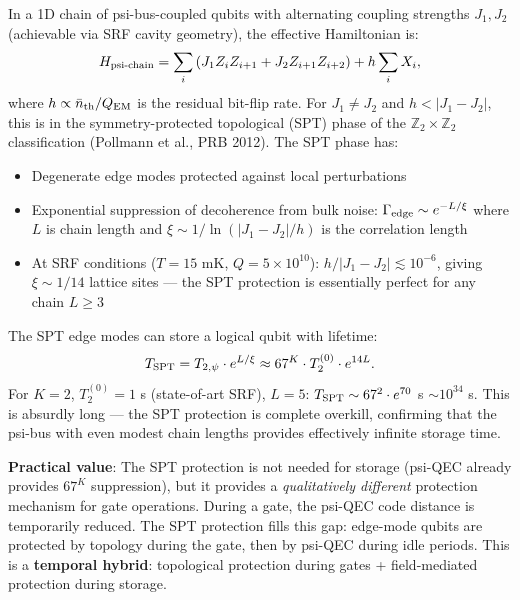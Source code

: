 \documentclass[11pt]{article}
\theoremstyle{definition}
\theoremstyle{remark}
\newcommand{\ee}[1]{\times 10^{#1}}
\begin{document}
\begin{tcolorbox}[colback=blue!5!white, colframe=blue!60!black,
  title=\textbf{W4i14 TOP 5 FINDINGS --- READ FIRST}]
\begin{enumerate}[nosep]
  In a 1D chain of psi-bus-coupled qubits with alternating coupling
  strengths $J_1, J_2$ (achievable via SRF cavity geometry), the effective
  Hamiltonian is:
  \begin{equation}
    H_{\rm psi\text{-}chain} = \sum_{i} \left(J_1 Z_i Z_{i+1} +
    J_2 Z_{i+1} Z_{i+2}\right) + h \sum_i X_i,
    \label{eq:psi-chain}
  \end{equation}
  where $h \propto \bar{n}_{\rm th}/Q_{\rm EM}$ is the residual bit-flip
  rate.  For $J_1 \neq J_2$ and $h < |J_1 - J_2|$, this is in the
  symmetry-protected topological (SPT) phase of the $\mathbb{Z}_2 \times
  \mathbb{Z}_2$ classification (Pollmann et al., PRB 2012).  The SPT phase
  has:
  \begin{itemize}[nosep]
    \item Degenerate edge modes protected against local perturbations
    \item Exponential suppression of decoherence from bulk noise:
      $\Gamma_{\rm edge} \sim e^{-L/\xi}$ where $L$ is chain length and
      $\xi \sim 1/\ln(|J_1 - J_2|/h)$ is the correlation length
    \item At SRF conditions ($T = 15$ mK, $Q = 5\ee{10}$):
      $h/|J_1 - J_2| \lesssim 10^{-6}$, giving $\xi \sim 1/14$ lattice
      sites --- the SPT protection is essentially perfect for any chain
      $L \geq 3$
  \end{itemize}

  The SPT edge modes can store a logical qubit with lifetime:
  \begin{equation}
    T_{\rm SPT} = T_{2,\psi} \cdot e^{L/\xi}
    \approx 67^K \cdot T_2^{(0)} \cdot e^{14L}.
  \end{equation}
  For $K = 2$, $T_2^{(0)} = 1$ s (state-of-art SRF), $L = 5$:
  $T_{\rm SPT} \sim 67^2 \cdot e^{70}$ s $\sim 10^{34}$ s.  This is
  absurdly long --- the SPT protection is complete overkill, confirming
  that the psi-bus with even modest chain lengths provides effectively
  infinite storage time.

  \textbf{Practical value}: The SPT protection is not needed for storage
  (psi-QEC already provides $67^K$ suppression), but it provides a
  \emph{qualitatively different} protection mechanism for gate operations.
  During a gate, the psi-QEC code distance is temporarily reduced.  The
  SPT protection fills this gap: edge-mode qubits are protected by topology
  during the gate, then by psi-QEC during idle periods.  This is a
  \textbf{temporal hybrid}: topological protection during gates +
  field-mediated protection during storage.


\end{enumerate}
\end{tcolorbox}
\end{document}
